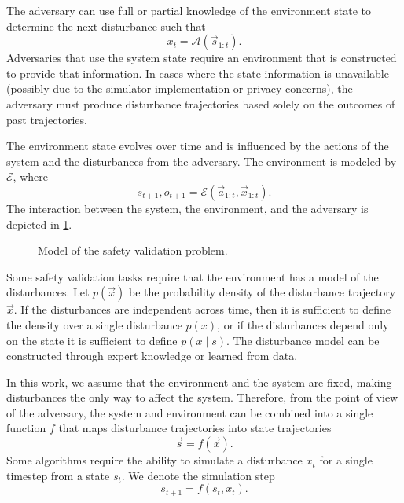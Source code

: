 The adversary can use full or partial knowledge of the environment state to determine the next disturbance such that
\begin{equation}
    x_t = \mathcal{A}(\vec{s}_{1:t}) \text{.} \label{eq:adversary}
\end{equation}
Adversaries that use the system state require an environment that is constructed to provide that information. In cases where the state information is unavailable (possibly due to the simulator implementation or privacy concerns), the adversary must produce disturbance trajectories based solely on the outcomes of past trajectories. 

The environment state evolves over time and is influenced by the actions of the system and the disturbances from the adversary. The environment is modeled by $\mathcal{E}$, where
\begin{equation}
    s_{t+1}, o_{t+1} = \mathcal{E}(\vec{a}_{1:t}, \vec{x}_{1:t}) \text{.} \label{eq:environment}
\end{equation} 
The interaction between the system, the environment, and the adversary is depicted in \cref{fig:problem}.

\begin{figure}[!t]
\centering
\resizebox{\columnwidth}{!}{}
\caption{Model of the safety validation problem.}
\label{fig:problem}
\end{figure}

Some safety validation tasks require that the environment has a model of the disturbances. Let $p(\vec{x})$ be the probability density of the disturbance trajectory $\vec{x}$. If the disturbances are independent across time, then it is sufficient to define the density over a single disturbance $p(x)$, or if the disturbances depend only on the state it is sufficient to define $p(x \mid s)$. The disturbance model can be constructed through expert knowledge or learned from data.

In this work, we assume that the environment and the system are fixed, making disturbances the only way to affect the system. Therefore, from the point of view of the adversary, the system and environment can be combined into a single function $f$ that maps disturbance trajectories into state trajectories
\begin{equation}
\vec{s} = f(\vec{x}) \text{.}
\end{equation}
Some algorithms require the ability to simulate a disturbance $x_t$ for a single timestep from a state $s_t$. We denote the simulation step
\begin{equation}
    s_{t+1} = f(s_t, x_t) \text{.}
\end{equation}

